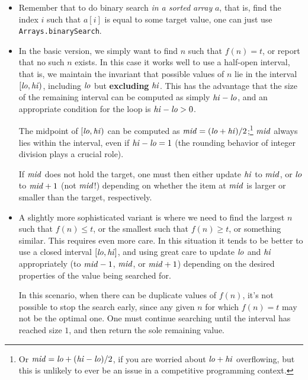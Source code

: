 \documentclass[10pt]{book}
\newif\iftodos
\newcommand{\todo}[1]{\iftodos\textcolor{red}{[TODO: #1]}\fi}
\begin{document}
\begin{itemize}
\item Remember that to do binary search \emph{in a sorted array} $a$,
  that is, find the index $i$ such that $a[i]$ is equal to some target
  value, one can just use \texttt{Arrays.binarySearch}.
\item In the basic version, we simply want to find $n$ such that
  $f(n) = t$, or report that no such $n$ exists.  In this case it
  works well to use a half-open interval, that is, we maintain the
  invariant that possible values of $n$ lie in the interval
  $[\mathit{lo}, \mathit{hi})$, including $\mathit{lo}$ but \textbf{excluding}
  $\mathit{hi}$.  This has the advantage that the size of the
  remaining interval can be computed as simply $\mathit{hi} - \mathit{lo}$,
  and an appropriate condition for the loop is $\mathit{hi} - \mathit{lo} > 0$.

  The midpoint of $[\mathit{lo}, \mathit{hi})$ can be computed as
  $\mathit{mid} = (\mathit{lo} + \mathit{hi})/2$;\footnote{Or
    $\mathit{mid} = \mathit{lo} + (\mathit{hi} - \mathit{lo})/2$, if you are worried about
    $\mathit{lo} + \mathit{hi}$ overflowing, but this is unlikely to ever be an
    issue in a competitive programming context.} $\mathit{mid}$ always
  lies within the interval, even if $\mathit{hi} - \mathit{lo} = 1$ (the rounding
  behavior of integer division plays a crucial role).

  If $\mathit{mid}$ does not hold the target, one must then either update
  $\mathit{hi}$ to $\mathit{mid}$, or $\mathit{lo}$ to $\mathit{mid} + 1$ (not $\mathit{mid}$!) depending
  on whether the item at $\mathit{mid}$ is larger or smaller than the target,
  respectively.

  \todo{Example code}

\item A slightly more sophisticated variant is where we need to find
  the largest $n$ such that $f(n) \leq t$, or the smallest such that
  $f(n) \geq t$, or something similar. This requires even more care.
  In this situation it tends to be better to use a closed interval
  $[\mathit{lo}, \mathit{hi}]$, and using great care to update $\mathit{lo}$ and $\mathit{hi}$
  appropriately (to $\mathit{mid} - 1$, $\mathit{mid}$, or $\mathit{mid}+1$) depending on
  the desired properties of the value being searched for.

  In this scenario, when there can be duplicate values of $f(n)$, it's
  not possible to stop the search early, since any given $n$ for which
  $f(n) = t$ may not be the optimal one.  One must continue searching
  until the interval has reached size $1$, and then return the sole
  remaining value.

  \todo{Talk about how to find midpoint based on whether we want greatest or least}
  \todo{Example code}
  \todo{if we want \emph{biggest} value satisfying something, need to
    set mid to CEILING of (lo+hi)/2?}
\end{itemize}
\end{document}
